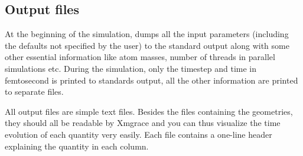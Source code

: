 \documentclass[12pt,a4paper]{article}
\begin{document}
\subsection{Output files}

At the beginning of the simulation, \abin dumps all the input parameters (including the defaults not specified by the user)
to the standard output along with some other essential information like atom masses, number of threads in parallel simulations etc.
During the simulation, only the timestep and time in femtosecond is printed to standards output, all the other information are printed to separate files.

All output files are simple text files. Besides the files containing the geometries, they should all be readable by Xmgrace and you can thus visualize the time evolution of each quantity very easily. Each file contains a one-line header explaining the quantity in each column.
\end{document}
